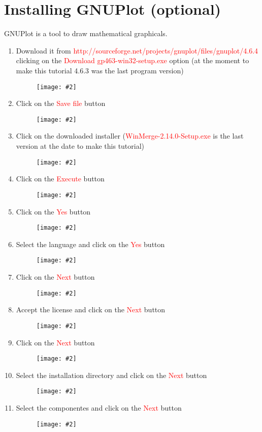 \documentclass[a4paper]{article}
\newcommand{\FIG}[2]
{
	\begin{figure}[ht!]
	\centering
	\texttt{[image: \#2]}
	\end{figure}
}
\newcommand{\FIGUREB}[1]{\FIG{0.26}{#1}}
\newcommand{\RED}[1] {\textcolor{red}{#1}}
\begin{document}
\clearpage

\section{Installing GNUPlot (optional)}

GNUPlot is a tool to draw mathematical graphicals.

\begin{enumerate}

\item Download it from
\RED{http://sourceforge.net/projects/gnuplot/files/gnuplot/4.6.4} clicking on
the \RED{Download gp463-win32-setup.exe} option (at the moment to make this
tutorial 4.6.3 was the last program version)
\FIGUREB{GNUPlot-1.png}

\clearpage

\item Click on the \RED{Save file} button
\FIGUREB{GNUPlot-2.png}

\item Click on the downloaded installer (\RED{WinMerge-2.14.0-Setup.exe} is the
last version at the date to make this tutorial)
\FIGUREB{GNUPlot-3.png}

\clearpage

\item Click on the \RED{Execute} button
\FIGUREB{GNUPlot-4.png}

\item Click on the \RED{Yes} button
\FIGUREB{GNUPlot-5.png}

\clearpage

\item Select the language and click on the \RED{Yes} button
\FIGUREB{GNUPlot-6.png}

\item Click on the \RED{Next} button
\FIGUREB{GNUPlot-7.png}

\clearpage

\item Accept the license and click on the \RED{Next} button
\FIGUREB{GNUPlot-8.png}

\item Click on the \RED{Next} button
\FIGUREB{GNUPlot-9.png}

\clearpage

\item Select the installation directory and click on the \RED{Next} button
\FIGUREB{GNUPlot-10.png}

\item Select the componentes and click on the \RED{Next} button
\FIGUREB{GNUPlot-11.png}


\end{enumerate}
\end{document}
